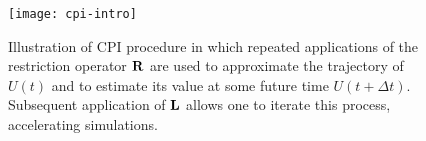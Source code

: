 \begin{figure}
  \centering
  \texttt{[image: cpi-intro]}
  \caption[Illustration of coarse projective integration]{Illustration
    of CPI procedure in which repeated applications of the restriction
    operator $\mathbf{R}$ are used to approximate the trajectory of $U(t)$
    and to estimate its value at some future time $U(t + \Delta
    t)$. Subsequent application of $\mathbf{L}$ allows one to iterate this
    process, accelerating simulations. \label{fig:cpi-ill}}
\end{figure}

